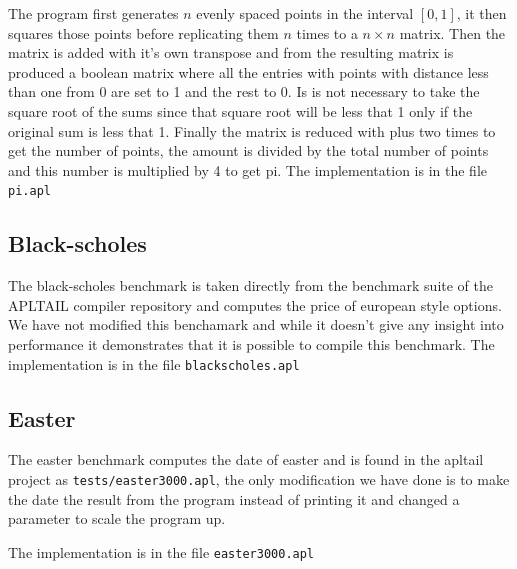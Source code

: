 \documentclass[11pt]{article}
\begin{document}
The program first generates $n$ evenly spaced points in the interval $[0,1]$, it then squares those points before replicating them $n$ times to a $n \times n$ matrix.
Then the matrix is added with it's own transpose and from the resulting matrix is produced a boolean matrix
where all the entries with points with distance less than one from 0 are set to 1 and the rest to 0. Is is not necessary to take
the square root of the sums since that square root will be less that 1 only if the original sum is less that 1.
Finally the matrix is reduced with plus two times to get the number of points, the amount is divided by the total number of points and
this number is multiplied by 4 to get pi.
The implementation is in the file {\tt pi.apl}

\subsection{Black-scholes}
The black-scholes benchmark is taken directly from the benchmark suite of the APLTAIL compiler repository and computes the price of european style options. We have not modified this benchamark and while it doesn't give any insight into performance it demonstrates
that it is possible to compile this benchmark. 
The implementation is in the file {\tt blackscholes.apl}

\subsection{Easter}
The easter benchmark computes the date of easter and is found in the apltail project as {\tt tests/easter3000.apl}, the only
modification we have done is to make the date the result from the program instead of printing it and changed a parameter to scale
the program up.

The implementation is in the file {\tt easter3000.apl}
\end{document}
